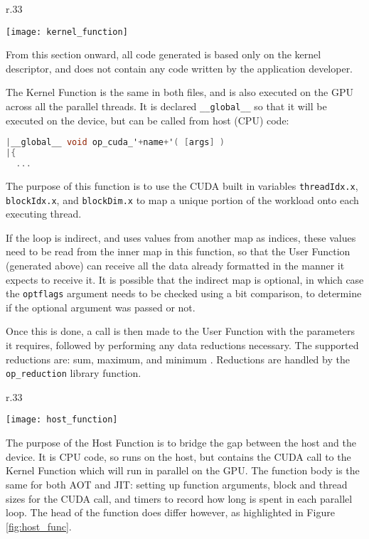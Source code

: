\begin{wrapfigure}[13]{r}{.33\textwidth}
  \centering
  \caption{Kernel Function}
  \label{fig:krnl_func}
  \texttt{[image: kernel\_function]}
\end{wrapfigure}
From this section onward, all code generated is based only on the kernel descriptor, and does not contain any code written by the application developer.
\par The Kernel Function is the same in both files, and is also executed on the GPU across all the parallel threads. It is declared \verb|__global__| so that it will be executed on the device, but can be called from host (CPU) code:
\begin{lstlisting}[language=C, backgroundcolor=\color{red!20}]
|__global__ void op_cuda_'+name+'( [args] )
|{
  ...
\end{lstlisting}

\noindent The purpose of this function is to use the CUDA built in variables \verb|threadIdx.x|, \verb|blockIdx.x|, and \verb|blockDim.x| to map a unique portion of the workload onto each executing thread.

 If the loop is indirect, and uses values from another map as indices, these values need to be read from the inner map in this function, so that the User Function (generated above) can receive all the data already formatted in the manner it expects to receive it. It is possible that the indirect map is optional, in which case the \verb|optflags| argument needs to be checked using a bit comparison, to determine if the optional argument was passed or not.
\par
Once this is done, a call is then made to the User Function with the parameters it requires, followed by performing any data reductions necessary. The supported reductions are: sum, maximum, and minimum \cite[p11]{manual}. Reductions are handled by the \verb|op_reduction| library function.

\begin{wrapfigure}[10]{r}{.33\textwidth}
  \centering
  \caption{Host Function}
  \label{fig:host_func}
  \texttt{[image: host\_function]}
\end{wrapfigure}
The purpose of the Host Function is to bridge the gap between the host and the device. It is CPU code, so runs on the host, but contains the CUDA call to the Kernel Function which will run in parallel on the GPU. The function body is the same for both AOT and JIT: setting up function arguments, block and thread sizes for the CUDA call, and timers to record how long is spent in each parallel loop. The head of the function does differ however, as highlighted in Figure \ref{fig:host_func}.
\vspace{\parskip}

